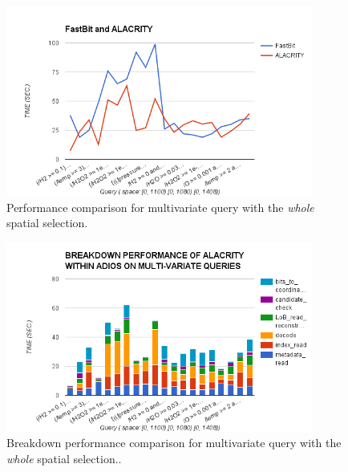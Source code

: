 \documentclass[11pt,a4paper]{article}
\begin{document}
\begin{figure}[ht]             
\begin{center}                 
    \includegraphics[width=0.90\textwidth]{figures/perf/alac-adios/multi-query-whole-space}
\end{center}
\caption{Performance comparison for multivariate query with the \emph{whole} spatial selection.}
\label{fig:multi-query-whole-space}  
\end{figure}


\begin{figure}[ht]             
\begin{center}                 
    \includegraphics[width=0.90\textwidth]{figures/perf/alac-adios/breakdown-multi-query-whole-space}
\end{center}
\caption{Breakdown performance comparison for multivariate query with the \emph{whole} spatial selection..}
\label{fig:multi-query-whole-space-breakdown}  
\end{figure}
\end{document}
